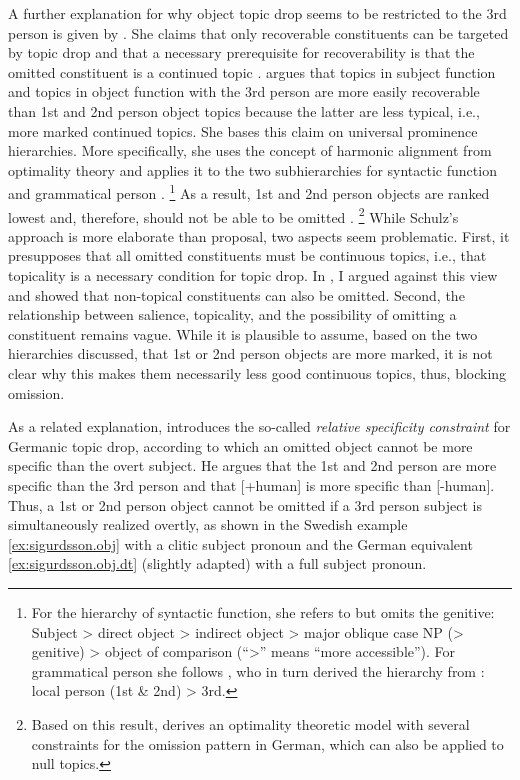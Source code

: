 A further explanation for why object topic drop seems to be restricted to the 3rd person is given by \citet{schulz2006}.
She claims that only recoverable  constituents can be targeted by topic drop and that a necessary prerequisite for recoverability  is that the omitted constituent is a continued topic  \citep[8]{schulz2006}.
\citet[11]{schulz2006} argues that topics in subject function and topics in object function with the 3rd person are more easily recoverable  than 1st and 2nd person object topics because the latter are less typical, i.e., more marked continued topics.
She bases this claim on universal prominence hierarchies.
More specifically, she uses the concept of harmonic alignment from optimality theory  \citep{prince.smolensky2004} and applies it to the two subhierarchies for syntactic function and grammatical person \citep[11--12]{schulz2006}.%
\footnote{For the hierarchy of syntactic function, she refers to \citet[66]{keenan.comrie1977} but omits the genitive:
Subject > direct object > indirect object > major oblique case NP (> genitive) > object of comparison (``>'' means ``more accessible'').
For grammatical person she follows \citet[674]{aissen1999}, who in turn derived the hierarchy from \citet{silverstein1976}: local person (1st \& 2nd) > 3rd.
}
As a result, 1st and 2nd person objects are ranked lowest and, therefore, should not be able to be omitted \citep[13; 17]{schulz2006}.%
\footnote{Based on this result, \citet{schulz2006} derives an optimality theoretic  model with several constraints for the omission pattern in German, which can also be applied to  null topics.}
%
While Schulz's approach is more elaborate than  proposal, two aspects seem problematic.
First, it presupposes that all omitted constituents must be continuous topics, i.e., that topicality is a necessary condition for topic drop.
In , I argued against this view and showed that non-topical constituents can also be omitted.
Second, the relationship between salience,  topicality, and the possibility of omitting a constituent remains vague.
While it is plausible to assume, based on the two hierarchies discussed, that 1st or 2nd person objects are more marked, it is not clear why this makes them necessarily less good continuous topics, thus, blocking omission.

As a related explanation, \citet[290]{sigurdsson2011} introduces the so-called \textit{relative specificity constraint} for Germanic topic drop, according to which an omitted object cannot be more specific than the overt subject.
He argues that the 1st and 2nd person are more specific than the 3rd person and that [+human] is more specific than [-human].
Thus, a 1st or 2nd person object cannot be omitted if a 3rd person subject is simultaneously realized overtly, as shown in the Swedish  example \ref{ex:sigurdsson.obj} with a clitic subject pronoun and the German equivalent \ref{ex:sigurdsson.obj.dt} (slightly adapted) with a full subject pronoun.

